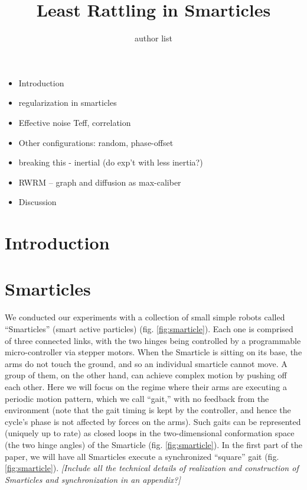 \documentclass[11pt]{article}
\renewcommand{\=}[1]{\stackrel{#1}{=}} %
\renewcommand{\(}{\left (}
\renewcommand{\)}{\right  )}
\renewcommand{\[}{\left [}
\renewcommand{\]}{\right ]}
\newcommand{\<}{\left <}
\renewcommand{\>}{\right >}
\theoremstyle{definition}
\theoremstyle{remark}
\renewcommand{\todo}[1]{\textit{\color{red}[#1]}}
\begin{document}
		\title{Least Rattling in Smarticles}
		
		\author{author list} %
		
		\maketitle


\tableofcontents

\begin{itemize}
	\item Introduction
	\item regularization in smarticles
	\item Effective noise Teff, correlation
	\item Other configurations: random, phase-offset
	\item breaking this - inertial (do exp't with less inertia?)
	\item RWRM -- graph and diffusion
	\subitem as max-caliber
	\item Discussion
\end{itemize}

\section{Introduction}

\section{Smarticles}
We conducted our experiments with a collection of small simple robots called ``Smarticles'' (smart active particles) (fig. \ref{fig:smarticle}). Each one is comprised of three connected links, with the two hinges being controlled by a programmable micro-controller via stepper motors. When the Smarticle is sitting on its base, the arms do not touch the ground, and so an individual smarticle cannot move. A group of them, on the other hand, can achieve complex motion by pushing off each other. Here we will focus on the regime where their arms are executing a periodic motion pattern, which we call ``gait,'' with no feedback from the environment (note that the gait timing is kept by the controller, and hence the cycle's phase is not affected by forces on the arms). Such gaits can be represented (uniquely up to rate) as closed loops in the two-dimensional conformation space (the two hinge angles) of the Smarticle (fig. \ref{fig:smarticle}). In the first part of the paper, we will have all Smarticles execute a synchronized ``square'' gait (fig. \ref{fig:smarticle}). \todo{Include all the technical details of realization and construction of Smarticles and synchronization in an appendix?}
\end{document}
